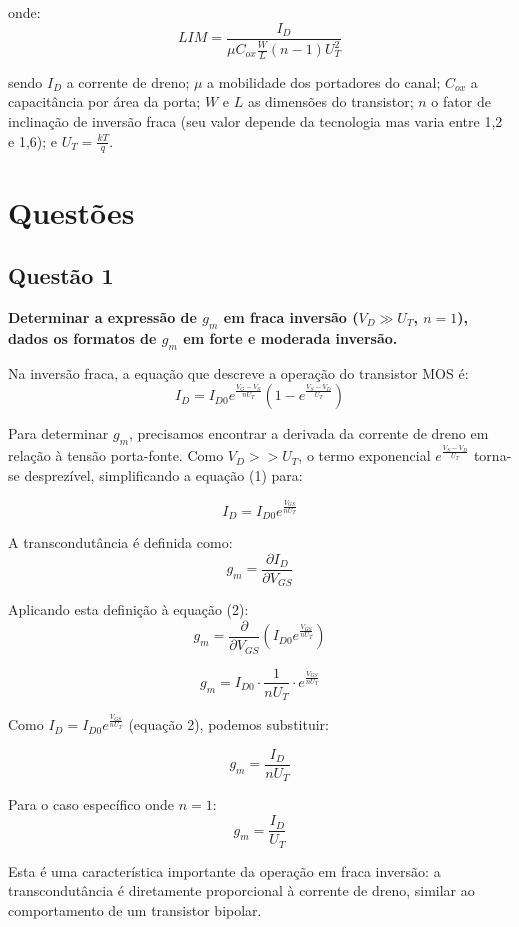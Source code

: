 \documentclass[12pt,a4paper]{article}
\begin{document}
onde:
$$LIM = \frac{I_D}{\mu C_{ox} \frac{W}{L} (n-1) U_T^2}$$

sendo $I_D$ a corrente de dreno; $\mu$ a mobilidade dos portadores do canal; $C_{ox}$ a capacitância por área da porta; $W$ e $L$ as dimensões do transistor; $n$ o fator de inclinação de inversão fraca (seu valor depende da tecnologia mas varia entre 1,2 e 1,6); e $U_T = \frac{kT}{q}$.

\newpage

\section*{Questões}

\subsection*{Questão 1}
	\textbf{Determinar a expressão de $g_m$ em fraca inversão ($V_D \gg U_T$, $n=1$), dados os formatos de $g_m$ em forte e moderada inversão.}

Na inversão fraca, a equação que descreve a operação do transistor MOS é:
$$I_D = I_{D0} e^{\frac{V_G - V_S}{nU_T}} \left(1 - e^{\frac{V_S - V_D}{U_T}}\right) $$

Para determinar $g_m$, precisamos encontrar a derivada da corrente de dreno em relação à tensão porta-fonte. Como $V_D >> U_T$, o termo exponencial $e^{\frac{V_S - V_D}{U_T}}$ torna-se desprezível, simplificando a equação (1) para:

$$I_D = I_{D0} e^{\frac{V_{GS}}{nU_T}} $$

A transcondutância é definida como:
$$g_m = \frac{\partial I_D}{\partial V_{GS}}$$

Aplicando esta definição à equação (2):
$$g_m = \frac{\partial}{\partial V_{GS}} \left( I_{D0} e^{\frac{V_{GS}}{nU_T}} \right)$$

$$g_m = I_{D0} \cdot \frac{1}{nU_T} \cdot e^{\frac{V_{GS}}{nU_T}}$$

Como $I_D = I_{D0} e^{\frac{V_{GS}}{nU_T}}$ (equação 2), podemos substituir:

$$g_m = \frac{I_D}{nU_T} $$

Para o caso específico onde $n = 1$:
$$g_m = \frac{I_D}{U_T} $$

Esta é uma característica importante da operação em fraca inversão: a transcondutância é diretamente proporcional à corrente de dreno, similar ao comportamento de um transistor bipolar.
\end{document}

